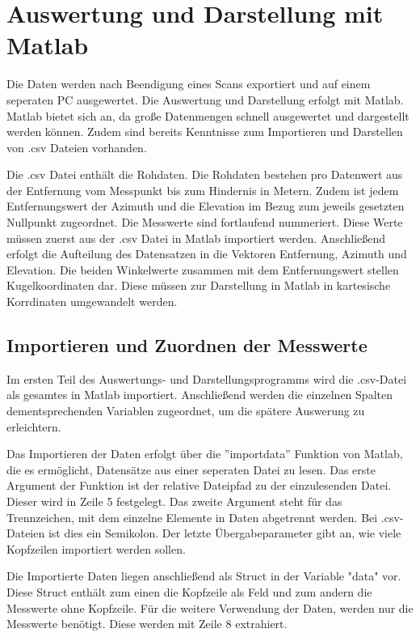 

\chapter{Auswertung und Darstellung mit Matlab}

Die Daten werden nach Beendigung eines Scans exportiert und auf einem seperaten PC ausgewertet. Die Auswertung und Darstellung erfolgt mit Matlab. Matlab bietet sich an, da große Datenmengen schnell ausgewertet und dargestellt werden können. Zudem sind bereits Kenntnisse zum Importieren und Darstellen von .csv Dateien vorhanden. 

Die .csv Datei enthält die Rohdaten. Die Rohdaten bestehen pro Datenwert aus der Entfernung vom Messpunkt bis zum Hindernis in Metern. Zudem ist jedem Entfernungswert der Azimuth und die Elevation im Bezug zum jeweils gesetzten Nullpunkt zugeordnet. Die Messwerte sind fortlaufend nummeriert. 
Diese Werte müssen zuerst aus der .csv Datei in Matlab importiert werden. Anschließend erfolgt die Aufteilung des Datensatzen in die Vektoren Entfernung, Azimuth und Elevation.
Die beiden Winkelwerte zusammen mit dem Entfernungswert stellen Kugelkoordinaten dar. Diese müssen zur Darstellung in Matlab in kartesische Korrdinaten umgewandelt werden. 



\section{Importieren und Zuordnen der Messwerte}

Im ersten Teil des Auswertungs- und Darstellungsprogramms wird die .csv-Datei als gesamtes in Matlab importiert. Anschließend werden die einzelnen Spalten dementsprechenden Variablen zugeordnet, um die spätere Auswerung zu erleichtern.

Das Importieren der Daten erfolgt über die ''importdata'' Funktion von Matlab, die es ermöglicht, Datensätze aus einer seperaten Datei zu lesen. Das erste Argument der Funktion ist der relative Dateipfad zu der einzulesenden Datei. Dieser wird in Zeile 5 festgelegt. Das zweite Argument steht für das Trennzeichen, mit dem einzelne Elemente in Daten abgetrennt werden. Bei .csv-Dateien ist dies ein Semikolon. Der letzte Übergabeparameter gibt an, wie viele Kopfzeilen importiert werden sollen.

Die Importierte Daten liegen anschließend als Struct in der Variable "data" vor. Diese Struct enthält zum einen die Kopfzeile als Feld und zum andern die Messwerte ohne Kopfzeile. Für die weitere Verwendung der Daten, werden nur die Messwerte benötigt. Diese werden mit Zeile 8 extrahiert. 

